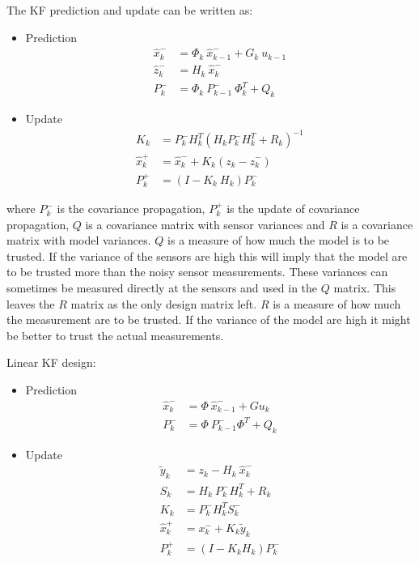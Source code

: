 The \ac{KF} prediction and update can be written as:
\begin{itemize}
\item Prediction
\begin{align}
\hat x_{k}^- &= \Phi_{k}\ \hat x_{k-1}^- + G_{k}\ u_{k-1}\nonumber\\
\hat z_{k}^- &= H_{k}\ \hat x_{k}^-\nonumber\\
P_{k}^- &= \Phi_{k}\ P_{k-1}^-\ \Phi_{k}^T + Q_{k}\nonumber
\end{align}

\item Update
\begin{align}
K_{k} &= P_{k}^- H_{k}^T(H_{k} P_{k}^- H_{k}^T+R_{k})^{-1}\nonumber\\
\hat x_{k}^+ &= \hat x_{k}^- + K_{k}(z_{k}-\hat z_{k}^-)\nonumber\\
P_{k}^+ &= (I-K_{k}\ H_{k})P_{k}^-\nonumber
\end{align}
\end{itemize}
where $P_{k}^-$ is the covariance propagation, $P_{k}^+$ is the update of covariance propagation, $Q$ is a covariance matrix with sensor variances and $R$ is a covariance matrix with model variances. $Q$ is a measure of how much the model is to be trusted. If the variance of the sensors are high this will imply that the model are to be trusted more than the noisy sensor measurements. These variances can sometimes be measured directly at the sensors and used in the $Q$ matrix. This leaves the $R$ matrix as the only design matrix left. $R$ is a measure of how much the measurement are to be trusted. If the variance of the model are high it might be better to trust the actual measurements.

Linear \ac{KF} design:
\begin{itemize}
\item Prediction
\begin{align}
\hat x_k^- &= \Phi\ \hat x_{k-1}^- + G u_k \\
P_k^- &= \Phi\ P_{k-1}^- \Phi^T + Q_{k}
\end{align}

\item Update
\begin{align}
\tilde y_k &= z_k - H_k\ \hat x_k^-\\
S_k &= H_k\ P_k^-H_k^T + R_k\\
K_k &= P_k^-H_k^TS_k^-\\
\hat x_k^+ &= x_k^- + K_k \tilde y_k\\
P_k^+ &= (I - K_k H_k) P_k^-
\end{align}
\end{itemize}

